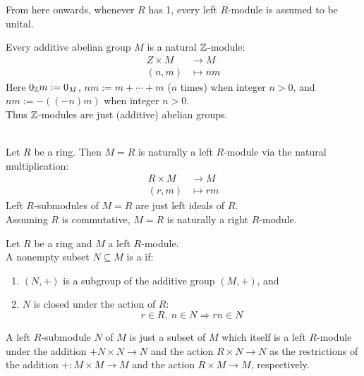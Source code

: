 From here onwards, whenever $R$ has 1, every left $R$-module is assumed to be unital.

\begin{example}
Every additive abelian group $M$ is a natural $\mathbb{Z}$-module:
\begin{align}
Z \times M &\rightarrow M \nonumber \\
(n,m) &\mapsto nm \nonumber
\end{align}
Here $0_{\mathbb{Z}} m := 0_M$, $nm := m + \cdots + m$ ($n$ times) when integer $n > 0$, and $nm := -((-n)m)$ when integer $n >0$. \\
Thus $\mathbb{Z}$-modules are just (additive) abelian groups.
\end{example}

\begin{example}
\\
Let $R$ be a ring. Then $M=R$ is naturally a left $R$-module via the natural multiplication:
\begin{align}
R \times M &\rightarrow M \nonumber \\
(r,m) &\mapsto rm \nonumber
\end{align}
Left $R$-submodules of $M=R$ are just left ideals of $R$.\\
Assuming $R$ is commutative, $M=R$ is naturally a right $R$-module.
\end{example}

\begin{definition}
Let $R$ be a ring and $M$ a left $R$-module.\\
A nonempty subset $N \subseteq M$ is a  if:
\begin{enumerate}[label=(\roman*)]
\item $(N, +)$ is a subgroup of the additive group $(M, +)$, and
\item $N$ is closed under the action of $R$:
\begin{equation}
r \in R,\ n \in N \Rightarrow rn \in N \nonumber
\end{equation}
\end{enumerate}
\end{definition}

\begin{remark}
A left $R$-submodule $N$ of $M$ is just a subset of $M$ which itself is a left $R$-module under the addition $+ N \times N \rightarrow N$ and the action $R \times N \rightarrow N$ as the restrictions of the addition $+: M \times M \rightarrow M$ and the action $R \times M \rightarrow M$, respectively.
\end{remark}

